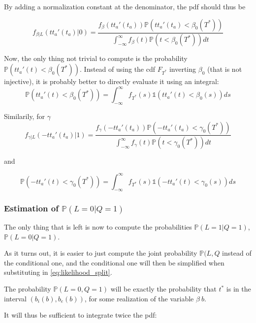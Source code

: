 \documentclass{article}
\begin{document}
By adding a normalization constant at the denominator, the pdf should thus be

\begin{equation}
  \label{eq:pdf_beta_early}
  f_{\beta | L}(tt_a'(t_a) | 0) = \frac{f_\beta(tt_a'(t_a))\mathbb{P}(tt_a'(t_a) < \beta_0(T^*))}{\int_{-\infty}^\infty f_\beta(t)\mathbb{P}(t < \beta_0(T^*)) dt}
\end{equation}

Now, the only thing not trivial to compute is the probability \(\mathbb{P}(tt_a'(t) < \beta_0(T^*))\).
Instead of using the cdf \(F_{T^*}\) inverting \(\beta_0\) (that is not injective), it is probably better to directly evaluate it using an integral:
\begin{equation*}
  \mathbb{P}(tt_a'(t) < \beta_0(T^*)) = \int_{-\infty}^\infty f_{T^*}(s) \mathbb{1}(tt_a'(t) < \beta_0(s)) ds
\end{equation*}

Similarily, for \(\gamma\)
\begin{equation*}
  f_{\gamma | L}(-tt_a'(t_a) | 1) = \frac{f_\gamma(-tt_a'(t_a))\mathbb{P}(-tt_a'(t_a) < \gamma_0(T^*))}{\int_{-\infty}^\infty f_\gamma(t)\mathbb{P}(t < \gamma_0(T^*)) dt}
\end{equation*}

and

\begin{equation*}
  \mathbb{P}(-tt_a'(t) < \gamma_0(T^*)) = \int_{-\infty}^\infty f_{T^*}(s) \mathbb{1}(-tt_a'(t) < \gamma_0(s)) ds
\end{equation*}

\subsubsection{Estimation of $\mathbb{P}(L=0 | Q=1)$}

The only thing that is left is now to compute the probabilities \(\mathbb{P}(L=1 | Q=1)\), \(\mathbb{P}(L=0 | Q=1)\).

As it turns out, it is easier to just compute the joint probability \(\mathbb{P}(L, Q\) instead of the conditional one, and the conditional one will then be simplified when substituting in \eqref{eq:likelihood_split}.

The probability \(\mathbb{P}(L=0, Q=1)\) will be exactly the probability that \(t^*\) is in the interval \((b_i(b), b_e(b))\), for some realization of the variable \(\beta\ b\).

It will thus be sufficient to integrate twice the pdf:
\end{document}
